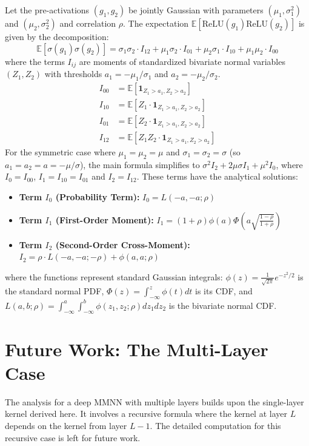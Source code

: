\documentclass{article}
\begin{document}
\begin{theorem}
Let the pre-activations $(g_1, g_2)$ be jointly Gaussian with parameters $(\mu_1, \sigma_1^2)$ and $(\mu_2, \sigma_2^2)$ and correlation $\rho$. The expectation $\mathbb{E}[\text{ReLU}(g_1)\text{ReLU}(g_2)]$ is given by the decomposition:
\begin{equation}
\label{eq:final_ntk_decomp}
\boxed{
\mathbb{E}[\sigma(g_1)\sigma(g_2)] = \sigma_1\sigma_2 \cdot I_{12} + \mu_1\sigma_2 \cdot I_{01} + \mu_2\sigma_1 \cdot I_{10} + \mu_1\mu_2 \cdot I_{00}
}
\end{equation}
where the terms $I_{ij}$ are moments of standardized bivariate normal variables $(Z_1, Z_2)$ with thresholds $a_1 = -\mu_1/\sigma_1$ and $a_2 = -\mu_2/\sigma_2$.
\begin{align*}
    I_{00} &= \mathbb{E}[\mathbf{1}_{Z_1>a_1, Z_2>a_2}] \\
    I_{10} &= \mathbb{E}[Z_1 \cdot \mathbf{1}_{Z_1>a_1, Z_2>a_2}] \\
    I_{01} &= \mathbb{E}[Z_2 \cdot \mathbf{1}_{Z_1>a_1, Z_2>a_2}] \\
    I_{12} &= \mathbb{E}[Z_1 Z_2 \cdot \mathbf{1}_{Z_1>a_1, Z_2>a_2}]
\end{align*}
For the symmetric case where $\mu_1=\mu_2=\mu$ and $\sigma_1=\sigma_2=\sigma$ (so $a_1=a_2=a=-\mu/\sigma$), the main formula simplifies to $\sigma^2 I_2 + 2\mu\sigma I_1 + \mu^2 I_0$, where $I_0=I_{00}$, $I_1=I_{10}=I_{01}$ and $I_2=I_{12}$. These terms have the analytical solutions:
\begin{itemize}
    \item \textbf{Term $I_0$ (Probability Term):} $I_0 = L(-a, -a; \rho)$
    \item \textbf{Term $I_1$ (First-Order Moment):} $I_1 = (1+\rho)\phi(a)\Phi\left(a\sqrt{\frac{1-\rho}{1+\rho}}\right)$
    \item \textbf{Term $I_2$ (Second-Order Cross-Moment):} $I_2 = \rho \cdot L(-a, -a; -\rho) + \phi(a, a; \rho)$
\end{itemize}
where the functions represent standard Gaussian integrals: $\phi(z) = \frac{1}{\sqrt{2\pi}}e^{-z^2/2}$ is the standard normal PDF, $\Phi(z) = \int_{-\infty}^z \phi(t)dt$ is its CDF, and $L(a, b; \rho) = \int_{-\infty}^a \int_{-\infty}^b \phi(z_1, z_2; \rho) dz_1 dz_2$ is the bivariate normal CDF.
\end{theorem}

\section{Future Work: The Multi-Layer Case}
The analysis for a deep MMNN with multiple layers builds upon the single-layer kernel derived here. It involves a recursive formula where the kernel at layer $L$ depends on the kernel from layer $L-1$. The detailed computation for this recursive case is left for future work.
\end{document}

